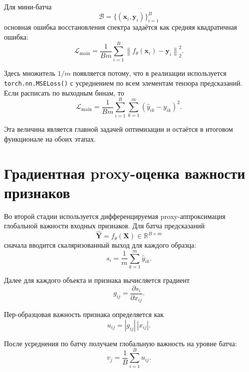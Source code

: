 \documentclass[11pt]{article}
\begin{document}
Для мини-батча
\begin{equation}
\mathcal{B} = \{(\mathbf{x}_i, \mathbf{y}_i)\}_{i=1}^{B}
\end{equation}
основная ошибка восстановления спектра задаётся как средняя квадратичная ошибка:
\begin{equation}
\mathcal{L}_{\mathrm{main}} = \frac{1}{Bm} \sum_{i=1}^{B} \left\| f_{\theta}(\mathbf{x}_i) - \mathbf{y}_i \right\|_2^2.
\end{equation}

Здесь множитель $1/m$ появляется потому, что в реализации используется \texttt{torch.nn.MSELoss()} с усреднением по всем элементам тензора предсказаний. Если расписать по выходным бинам, то
\begin{equation}
\mathcal{L}_{\mathrm{main}} = \frac{1}{Bm} \sum_{i=1}^{B} \sum_{k=1}^{m} (\hat{y}_{ik} - y_{ik})^2.
\end{equation}

Эта величина является главной задачей оптимизации и остаётся в итоговом функционале на обоих этапах.

\section{Градиентная proxy-оценка важности признаков}

Во второй стадии используется дифференцируемая proxy-аппроксимация глобальной важности входных признаков. Для батча предсказаний
\begin{equation}
\hat{\mathbf{Y}} = f_{\theta}(\mathbf{X}) \in \mathbb{R}^{B \times m}
\end{equation}
сначала вводится скаляризованный выход для каждого образца:
\begin{equation}
 s_i = \frac{1}{m} \sum_{k=1}^{m} \hat{y}_{ik}.
\end{equation}

Далее для каждого объекта и признака вычисляется градиент
\begin{equation}
 g_{ij} = \frac{\partial s_i}{\partial x_{ij}}.
\end{equation}

Пер-образцовая важность признака определяется как
\begin{equation}
 u_{ij} = |g_{ij}| \, |x_{ij}|.
\end{equation}

После усреднения по батчу получаем глобальную важность на уровне батча:
\begin{equation}
 v_j = \frac{1}{B} \sum_{i=1}^{B} u_{ij}.
\end{equation}
\end{document}
